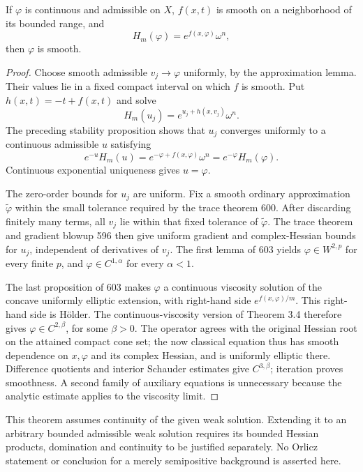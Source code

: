 \begin{theorem}\label{draft:604-continuous-hessian-regularity}
If $\varphi$ is continuous and admissible on $X$, $f(x,t)$ is smooth
on a neighborhood of its bounded range, and
\[
 H_m(\varphi)=e^{f(x,\varphi)}\omega^n,
\]
then $\varphi$ is smooth.
\end{theorem}
\begin{proof}
Choose smooth admissible $v_j\to\varphi$ uniformly, by the approximation
lemma. Their values lie in a fixed compact interval on which $f$ is
smooth. Put $h(x,t)=-t+f(x,t)$ and solve
\[
 H_m(u_j)=e^{u_j+h(x,v_j)}\omega^n.
\]
The preceding stability proposition shows that $u_j$ converges uniformly
to a continuous admissible $u$ satisfying
\[
 e^{-u}H_m(u)=e^{-\varphi+f(x,\varphi)}\omega^n
                              =e^{-\varphi}H_m(\varphi).
\]
Continuous exponential uniqueness gives $u=\varphi$.

The zero-order bounds for $u_j$ are uniform. Fix a smooth ordinary
approximation $\widetilde\varphi$ within the small tolerance required
by the trace theorem 600. After discarding finitely many terms, all
$v_j$ lie within that fixed tolerance of $\widetilde\varphi$.
The trace theorem and gradient blowup 596 then give uniform gradient
and complex-Hessian bounds for $u_j$, independent of derivatives of
$v_j$. The first lemma of 603 yields
$\varphi\in W^{2,p}$ for every finite $p$, and
$\varphi\in C^{1,\alpha}$ for every $\alpha<1$.

The last proposition of 603 makes $\varphi$ a continuous viscosity
solution of the concave uniformly elliptic extension, with right-hand
side $e^{f(x,\varphi)/m}$. This right-hand side is H\"older. The
continuous-viscosity version of Theorem 3.4 therefore gives
$\varphi\in C^{2,\beta}$, for some $\beta>0$.
The operator agrees with the original Hessian root on the attained
compact cone set; the now classical equation thus has smooth dependence
on $x,\varphi$ and its complex Hessian, and is uniformly elliptic there.
Difference quotients and interior Schauder estimates give $C^{3,\beta}$;
iteration proves smoothness. A second family of auxiliary equations is
unnecessary because the analytic estimate applies to the viscosity limit.
\end{proof}

This theorem assumes continuity of the given weak solution. Extending
it to an arbitrary bounded admissible weak solution requires its bounded
Hessian products, domination and continuity to be justified separately.
No Orlicz statement or conclusion for a merely semipositive background
is asserted here.
